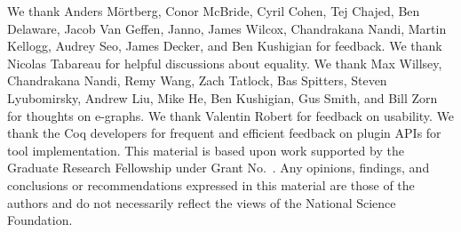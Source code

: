 \documentclass[sigplan,10pt,review,anonymous]{acmart}\settopmatter{printfolios=true,printccs=false,printacmref=false}
\begin{document}










\begin{acks}                            %
We thank Anders M\"ortberg, Conor McBride, Cyril Cohen, Tej Chajed, Ben Delaware, Jacob Van Geffen, Janno, James Wilcox, Chandrakana Nandi, 
Martin Kellogg, Audrey Seo, James Decker,
and Ben Kushigian for feedback. %
We thank Nicolas Tabareau for helpful discussions about equality. %
We thank Max Willsey, Chandrakana Nandi, Remy Wang, Zach Tatlock, Bas Spitters, Steven Lyubomirsky, Andrew Liu, Mike He, Ben Kushigian, 
Gus Smith, and Bill Zorn for thoughts on e-graphs.
We thank Valentin Robert for feedback on usability.
We thank the Coq developers for frequent and efficient feedback on plugin APIs for tool implementation.
This material is based upon work supported by the  Graduate Research Fellowship under Grant No.~. Any opinions, findings, and conclusions or recommendations expressed in this material are those of the authors and do not necessarily reflect the views of the National Science Foundation.
\end{acks}






\end{document}
